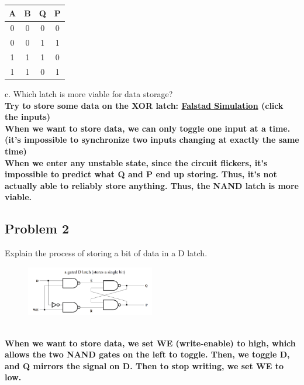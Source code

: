 \documentclass{article}
\begin{document}
    \begin{table}[!h]
    \centering
\begin{tabular}{|c|c|c|c|}
\hline
\textbf{A} & \textbf{B} & \textbf{Q} & \textbf{P} \\ \hline
0          & 0          & 0          & 0          \\ \hline
0          & 0          & 1          & 1          \\ \hline
1          & 1          & 1          & 0          \\ \hline
1          & 1          & 0          & 1          \\ \hline
\end{tabular}
\end{table}

c. Which latch is more viable for data storage? \\
\textbf{Try to store some data on the XOR latch: \href{https://www.falstad.com/circuit/circuitjs.html?ctz=CQAgjCAMB0l3BWcMBMcUHYMGZIA4UA2ATmIxAUgoqoQFMBaMMAKAHcQUFDP8RtCeXkMjtO3fpAAs-QZJmiAsrKFohUuMKidoCFsoFDcMjVWPaUulgBlwKIWGIoQeKo+duQAMwCGAGwBnOmpRWzB7fjQXMyjPX0DgpFEwBBlw1T4uHjULbT0UtIjzLPlcpD0OEpz0zjwRMRLzGpQUBRYgA}{Falstad Simulation} (click the inputs)\\
When we want to store data, we can only toggle one input at a time. (it’s impossible to synchronize two inputs changing at exactly the same time)\\
When we enter any unstable state, since the circuit flickers, it’s impossible to predict what Q and P end up storing. Thus, it’s not actually able to reliably store anything. 
Thus, the NAND latch is more viable.
}
\subsection*{Problem 2}
Explain the process of storing a bit of data in a D latch.
\begin{figure}[!h]
    \centering
    \includegraphics[width=0.5\textwidth]{figures/latch2.png}
\end{figure}\\

\textbf{When we want to store data, we set WE (write-enable) to high, which allows the two NAND gates on the left to toggle. Then, we toggle D, and Q mirrors the signal on D. Then to stop writing, we set WE to low.}
\end{document}
